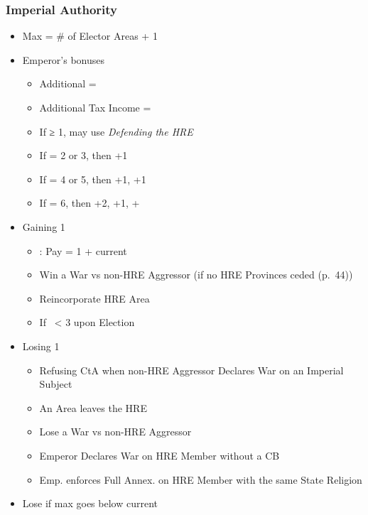 \documentclass[10pt]{article}
\begin{document}
\subsubsection*{Imperial Authority }
\begin{itemize}
	\item Max \authority = \# of Elector Areas + 1
	\item Emperor's bonuses
	\begin{itemize}
		\item Additional \manpower = \authority
		\item Additional Tax Income = \authority
		\item If \authority ≥ 1, may use \emph{Defending the HRE}
		\item If \authority = 2 or 3, then +1\diplopower
		\item If \authority = 4 or 5, then +1\diplopower, +1\milpower
		\item If \authority = 6, then +2\diplopower, +1\milpower, +
	\end{itemize}
	\item Gaining 1 \authority
	\begin{itemize}
		\item {}: Pay \adminpower = 1 + current \authority
		\item Win a War vs non-HRE Aggressor (if no HRE Provinces ceded (p.~44))
		\item Reincorporate HRE Area
		\item If \authority~< 3 upon Election
	\end{itemize}
	\item Losing 1 \authority
	\begin{itemize}
		\item Refusing CtA when non-HRE Aggressor Declares War on an Imperial Subject
		\item An Area leaves the HRE
		\item Lose a War vs non-HRE Aggressor
		\item Emperor Declares War on HRE Member without a CB
		\item Emp. enforces Full Annex. on HRE Member with the same State Religion
	\end{itemize}
	\item Lose \authority if max \authority goes below current \authority
\end{itemize}
\end{document}
